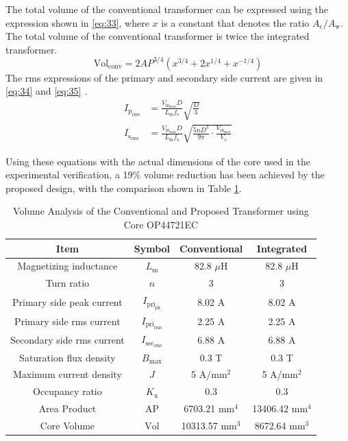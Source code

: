 \documentclass[lettersize,journal]{IEEEtran}
\begin{document}
The total volume of the conventional transformer can be expressed using the expression shown in \eqref{eq:33}, where $x$ is a constant that denotes the ratio $A_{\mathrm{c}}/A_{\mathrm{w}}$. The total volume of the conventional transformer is twice the integrated transformer.
\begin{equation}
\label{eq:33}
\mathrm{Vol}_{\mathrm{conv}} = 2 AP^{3/4} (x^{3/4} + 2 x^{1/4} + x^{-1/4})
\end{equation}
The rms expressions of the primary and secondary side current are given in \eqref{eq:34} and \eqref{eq:35} \cite{ref8}.
\begin{align}
I_{\mathrm{p}_{\mathrm{rms}}} &= \frac{V_{\mathrm{in}_{\mathrm{max}}} D}{L_{\mathrm{m}} f_{\mathrm{s}}} \sqrt{\frac{D}{3}} \label{eq:34}\\
I_{\mathrm{s}_{\mathrm{rms}}} &= \frac{V_{\mathrm{in}_{\mathrm{max}}} D}{L_{\mathrm{m}} f_{\mathrm{s}}} \sqrt{\frac{5 n D^3}{9 \pi} \cdot \frac{V_{\mathrm{in}_{\mathrm{max}}}}{V_{\mathrm{o}}}} \label{eq:35}
\end{align}

Using these equations with the actual dimensions of the core used in the experimental verification, a 19\% volume reduction has been achieved by the proposed design, with the comparison shown in Table \ref{tab:volume}.

\begin{table}[htbp]
    \caption{Volume Analysis of the Conventional and Proposed Transformer using Core OP44721EC}
    \centering
    \footnotesize %
    \setlength{\tabcolsep}{4pt} %
    \begin{tabular}{cccc}
        \hline
        \textbf{Item} & \textbf{Symbol} & \textbf{Conventional} & \textbf{Integrated} \\
        \hline \hline
        Magnetizing inductance & $L_{\mathrm{m}}$ & 82.8 $\mu$H & 82.8 $\mu$H \\
        Turn ratio & $n$ & 3 & 3 \\
        Primary side peak current & $I_{\mathrm{pri}_{\mathrm{pk}}}$ & 8.02 A & 8.02 A \\
        Primary side rms current & $I_{\mathrm{pri}_{\mathrm{rms}}}$ & 2.25 A & 2.25 A \\
        Secondary side rms current & $I_{\mathrm{sec}_{\mathrm{rms}}}$ & 6.88 A & 6.88 A \\
        Saturation flux density & $B_{\mathrm{max}}$ & 0.3 T & 0.3 T \\
        Maximum current density & $J$ & 5 A/mm$^2$ & 5 A/mm$^2$ \\
        Occupancy ratio & $K_{\mathrm{u}}$ & 0.3 & 0.3 \\
        Area Product & $\mathrm{AP}$ & 6703.21 mm$^4$ & 13406.42 mm$^4$ \\
        Core Volume & $\mathrm{Vol}$ & 10313.57 mm$^3$ & 8672.64 mm$^3$ \\
        \hline
    \end{tabular}
    \label{tab:volume}
\end{table}
\end{document}
